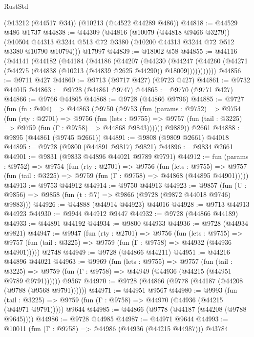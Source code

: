 \begin{lexlean}{RustStd}
\begin{coremodule}
    (@13212 (@44517 @34))
    (@10213 (@44522 @44289 @486))
@44818 := @44529 @486 @1737
@44838 := @44309
    (@44816
      (@10079 (@44818 @9466 @3279))
      (@10504 @44313 @3244 @513 @72 @3380 (@10200 @44313 @3244 @72 @512 @3380 @10790 @10794)))
    @17997
@44839 := @18002 @58
@44855 := @44116
    (@44141
      (@44182
        (@44184
          (@44186
            (@44207
              (@44230
                (@44247
                  (@44260 (@44271 (@44275 (@44838 (@10213 (@44839 @2625 @44290)) @18009)))))))))))
@44856 := @9711 @427
@44860 := @9713 (@9717 @427) (@9723 @427)
@44861 := @9732 @44015
@44863 := @9728 (@44861 @9747)
@44865 := @9770 (@9771 @427)
@44866 := @9766 @44865
@44868 := @9728 (@44866 @9796)
@44885 := @9727
    (fun (fn : @404) =>
    @44863
      (@9750
        (@9753
          (fun (params : @9752) =>
          @9754
            (fun (rty : @2701) =>
            @9756
              (fun (lets : @9755) =>
              @9757 (fun (tail : @3225) => @9759 (fun (Γ : @9758) => @44868 @9843))))))
        @9889))
    @2661
@44888 := @9895 (@44861 (@9745 @2661))
@44891 := @9808 (@9809 @2661) @44018
@44895 := @9728 (@9800 (@44891 @9817) @9821)
@44896 := @9834 @2661
@44901 := @9831 (@9833 @44896 @44021 @9789 @9791)
@44912 := fun (params : @9752) =>
  @9754
    (fun (rty : @2701) =>
    @9756
      (fun (lets : @9755) =>
      @9757 (fun (tail : @3225) => @9759 (fun (Γ : @9758) => @44868 (@44895 @44901)))))
@44913 := @9753 @44912
@44914 := @9750 @44913
@44923 := @9857
    (fun (U : @9856) => @9858 (fun (t : @7) => @9866 (@9728 (@9872 @44018 @9746) @9883)))
@44926 := @44888 (@44914 @44923) @44016
@44928 := @9713 @44913 @44923
@44930 := @9944 @44912 @9447
@44932 := @9728 (@44866 @44189)
@44933 := @44891 @44192
@44934 := @9800 @44933
@44936 := @9728 (@44934 @9821)
@44947 := @9947
    (fun (rty : @2701) =>
    @9756
      (fun (lets : @9755) =>
      @9757 (fun (tail : @3225) => @9759 (fun (Γ : @9758) => @44932 (@44936 @44901)))))
    @2748
@44949 := @9728 (@44866 @44211)
@44951 := @44216 @44896 @44021
@44963 := @9969
    (fun (lets : @9755) =>
    @9757
      (fun (tail : @3225) =>
      @9759 (fun (Γ : @9758) => @44949 (@44936 (@44215 (@44951 @9789 @9791))))))
    @9567
@44970 := @9728 (@44866 (@9778 (@44187 (@44208 (@9788 (@9568 @9791))))))
@44971 := @44951 @9567
@44980 := @9993
    (fun (tail : @3225) => @9759 (fun (Γ : @9758) => @44970 (@44936 (@44215 (@44971 @9791)))))
    @9644
@44985 := @44866 (@9778 (@44187 (@44208 (@9788 @9645))))
@44986 := @9728 @44985
@44987 := @44971 @9644
@44993 := @10011 (fun (Γ : @9758) => @44986 (@44936 (@44215 @44987))) @43784

\end{coremodule}
\end{lexlean}
